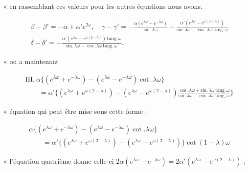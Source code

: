 \documentclass[11pt,a4paper]{article}
\begin{document}
« en rassemblant ces valeurs pour les autres équations nous avons.

\begin{align*}
&\beta-\beta'=-\alpha+\alpha' e^{2\omega},\quad \gamma-\gamma'=-\frac{\alpha(e^{\lambda\omega}-e^{-\lambda\omega})}{\text{sin.}\,\lambda\omega}+\frac{\alpha'(e^{\lambda\omega}-e^{\omega(2-\lambda)})}{\text{sin.}\,\lambda\omega-\cos.\lambda\omega\,\text{tang.}\,\omega} \\
&\delta-\delta'=-\frac{\alpha'(e^{\lambda\omega}-e^{\omega(2-\lambda)})\,\text{tang.}\,\omega}{\text{sin.}\,\lambda\omega-\cos.\lambda\omega\,\text{tang.}\,\omega}.
\end{align*}

« on a maintenant

\begin{align*}
&\text{III.}\ \alpha\big\{(e^{\lambda\omega}+e^{-\lambda\omega})-(e^{\lambda\omega}-e^{-\lambda\omega})\cot.\lambda\omega\big\} \\
&\qquad=\alpha'\Big\{(e^{\lambda\omega}+e^{\omega(2-\lambda)})-(e^{\lambda\omega}-e^{\omega(2-\lambda)})\frac{\cos.\lambda\omega+\text{sin.}\,\lambda\omega\,\text{tang.}\,\omega}{\text{sin.}\,\lambda\omega-\cos.\lambda\omega\,\text{tang.}\,\omega}\Big\}
\end{align*}

« équation qui peut être mise sous cette forme :

\begin{align*}
&\alpha\big\{(e^{\lambda\omega}+e^{-\lambda\omega})-(e^{\lambda\omega}-e^{-\lambda\omega})\cot.\lambda\omega\big\} \\
&\qquad=\alpha'\big\{(e^{\lambda\omega}+e^{\omega(2-\lambda)})-(e^{\lambda\omega}-e^{\omega(2-\lambda)})\big\}\cot(1-\lambda)\omega
\end{align*}

« l'équation quatrième donne celle-ci
$2\alpha(e^{\lambda\omega}-e^{-\lambda\omega})=2\alpha'(e^{\lambda\omega}-e^{\omega(2-\lambda)})$ ;


\end{document}
